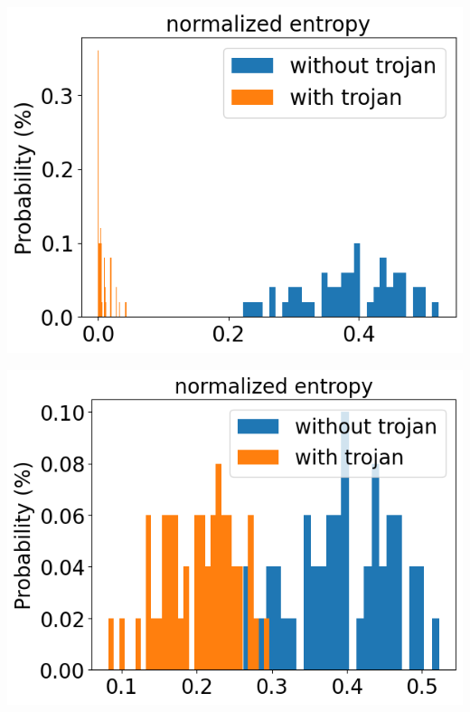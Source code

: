 \documentclass{report}
\theoremstyle{definition}
\theoremstyle{remark}
\begin{document}
\begin{minipage}{\textwidth}
\centering
\begin{minipage}{.4\textwidth}
    \centering
    \includegraphics[width=\textwidth]{img/STRIPStrong.png}
    \label{fig:strongTrigger}
\end{minipage}
\hspace{0.1\textwidth}
\begin{minipage}{.4\textwidth}
    \centering
    \includegraphics[width=\textwidth]{img/StripWeak.png}
    \label{fig:weakTrigger}
\end{minipage}
\end{minipage}
\end{document}
